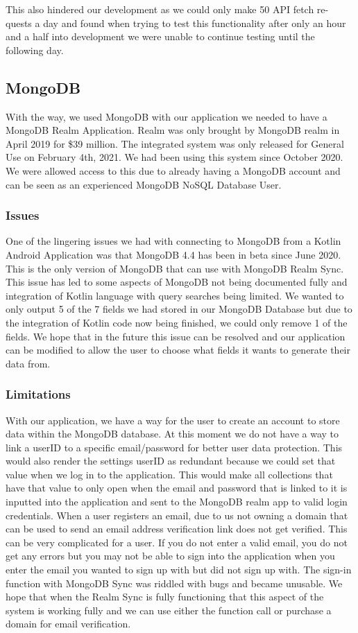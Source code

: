 \newline
\newline
This also hindered our development as we could only make 50 API fetch re- quests a day and found when trying to test this functionality after only an hour and a half into development we were unable to continue testing until the following day.
\newpage
\subsection{MongoDB}
With the way, we used MongoDB with our application we needed to have a MongoDB Realm Application. Realm was only brought by MongoDB realm in April 2019 for \$39 million. The integrated system was only released for General Use on February 4th, 2021. We had been using this system since October 2020. We were allowed access to this due to already having a MongoDB account and can be seen as an experienced MongoDB NoSQL Database User.
\subsubsection{Issues}
One of the lingering issues we had with connecting to MongoDB from a Kotlin Android Application was that MongoDB 4.4 has been in beta since June 2020. This is the only version of MongoDB that can use with MongoDB Realm Sync. This issue has led to some aspects of MongoDB not being documented fully and integration of Kotlin language with query searches being limited. We wanted to only output 5 of the 7 fields we had stored in our MongoDB Database but due to the integration of Kotlin code now being finished, we could only remove 1 of the fields. We hope that in the future this issue can be resolved and our application can be modified to allow the user to choose what fields it wants to generate their data from.
\subsubsection{Limitations}
With our application, we have a way for the user to create an account to store data within the MongoDB database. At this moment we do not have a way to link a userID to a specific email/password for better user data protection. This would also render the settings userID as redundant because we could set that value when we log in to the application. This would make all collections that have that value to only open when the email and password that is linked to it is inputted into the application and sent to the MongoDB realm app to valid login credentials.
\newline
When a user registers an email, due to us not owning a domain that can be used to send an email address verification link does not get verified. This can be very complicated for a user. If you do not enter a valid email, you do not get any errors but you may not be able to sign into the application when you enter the email you wanted to sign up with but did not sign up with. The sign-in function with MongoDB Sync was riddled with bugs and became unusable. We hope that when the Realm Sync is fully functioning that this aspect of the system is working fully and we can use either the function call or purchase a domain for email verification.
